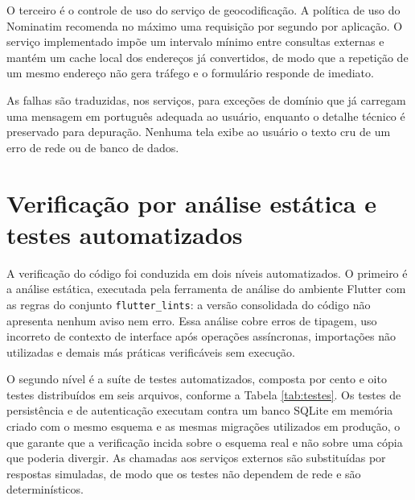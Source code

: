 O terceiro é o controle de uso do serviço de geocodificação. A política de uso do Nominatim recomenda no máximo uma requisição por segundo por aplicação. O serviço implementado impõe um intervalo mínimo entre consultas externas e mantém um cache local dos endereços já convertidos, de modo que a repetição de um mesmo endereço não gera tráfego e o formulário responde de imediato.

As falhas são traduzidas, nos serviços, para exceções de domínio que já carregam uma mensagem em português adequada ao usuário, enquanto o detalhe técnico é preservado para depuração. Nenhuma tela exibe ao usuário o texto cru de um erro de rede ou de banco de dados.

\section{Verificação por análise estática e testes automatizados}

A verificação do código foi conduzida em dois níveis automatizados. O primeiro é a análise estática, executada pela ferramenta de análise do ambiente Flutter com as regras do conjunto \texttt{flutter\_lints}: a versão consolidada do código não apresenta nenhum aviso nem erro. Essa análise cobre erros de tipagem, uso incorreto de contexto de interface após operações assíncronas, importações não utilizadas e demais más práticas verificáveis sem execução.

O segundo nível é a suíte de testes automatizados, composta por cento e oito testes distribuídos em seis arquivos, conforme a Tabela \ref{tab:testes}. Os testes de persistência e de autenticação executam contra um banco SQLite em memória criado com o mesmo esquema e as mesmas migrações utilizados em produção, o que garante que a verificação incida sobre o esquema real e não sobre uma cópia que poderia divergir. As chamadas aos serviços externos são substituídas por respostas simuladas, de modo que os testes não dependem de rede e são determinísticos.

